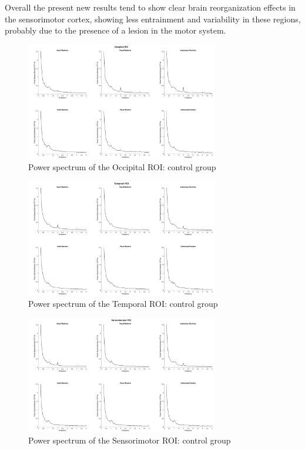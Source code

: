 Overall the present new results tend to show clear brain reorganization effects in the sensorimotor cortex, showing less entrainment and variability in these regions, probably due to the presence of a lesion in the motor system.  
\begin{figure}[htbp]
    \centering
    \includegraphics[width=0.75\textwidth]{healthy_images/occipitalROI_graph.png}
        \caption{Power spectrum of the Occipital ROI: control group}
        \label{fig: Waveforms control: occipital} 
\end{figure}
\begin{figure}[htbp]
    \centering
        \includegraphics[width=0.75\textwidth]{healthy_images/temporalROI_graph.png}
        \caption{Power spectrum of the Temporal ROI: control group}
        \label{fig: Waveforms control: temporal}   
\end{figure}
\begin{figure}[htbp]
    \centering
    \includegraphics[width=0.75\textwidth]{healthy_images/sensorimotorROI_graph.png}
    \caption{Power spectrum of the Sensorimotor ROI: control group}
    \label{fig: Waveforms control: sensorimotor}   
\end{figure}

